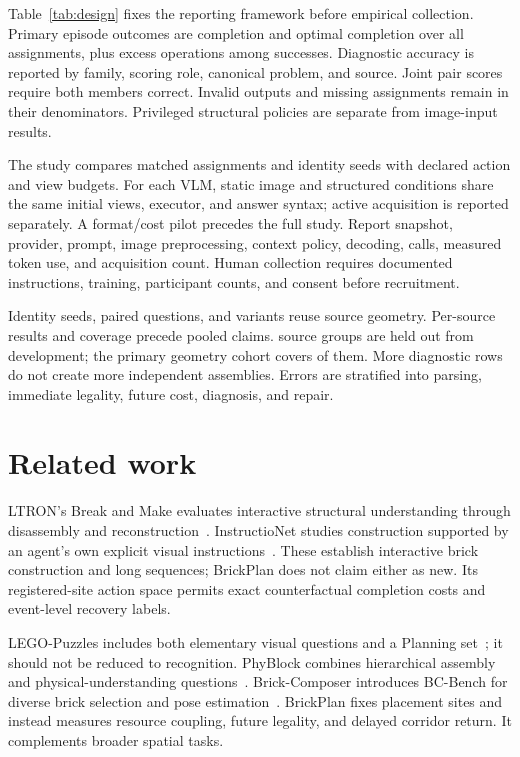 \documentclass[10pt,twocolumn,letterpaper]{article}
\begin{document}
Table~\ref{tab:design} fixes the reporting framework before empirical
collection. Primary episode outcomes are completion and optimal
completion over all assignments, plus excess operations among successes.
Diagnostic accuracy is reported by family, scoring role, canonical
problem, and source. Joint pair scores require both members correct.
Invalid outputs and missing assignments remain in their denominators.
Privileged structural policies are separate from image-input results.

The study compares matched assignments and identity seeds with declared
action and view budgets. For each VLM, static image and structured
conditions share the same initial views, executor, and answer syntax;
active acquisition is reported separately. A format/cost pilot precedes
the full study. Report snapshot, provider, prompt, image preprocessing,
context policy, decoding, calls, measured token use, and acquisition
count. Human collection requires documented instructions, training,
participant counts, and consent before recruitment.

Identity seeds, paired questions, and variants reuse source geometry.
Per-source results and coverage precede pooled claims.
\HeldoutSourceCount{} source groups are held out from development;
the primary geometry cohort covers \HeldoutPrimarySourceCount{} of them.
More diagnostic rows do not create more independent assemblies.
Errors are stratified into parsing, immediate legality, future cost,
diagnosis, and repair.

\section{Related work}
LTRON's Break and Make evaluates interactive structural understanding
through disassembly and reconstruction~\cite{ltron}. InstructioNet studies
construction supported by an agent's own explicit visual
instructions~\cite{instructionet}. These establish interactive brick
construction and long sequences; BrickPlan does not claim either as new.
Its registered-site action space permits exact counterfactual completion
costs and event-level recovery labels.

LEGO-Puzzles includes both elementary visual questions and a Planning
set~\cite{lego}; it should not be reduced to recognition.
PhyBlock combines hierarchical assembly and physical-understanding
questions~\cite{phyblock}. Brick-Composer introduces BC-Bench for diverse
brick selection and pose estimation~\cite{composer}. BrickPlan fixes
placement sites and instead measures resource coupling, future legality,
and delayed corridor return. It complements broader spatial tasks.
\end{document}
